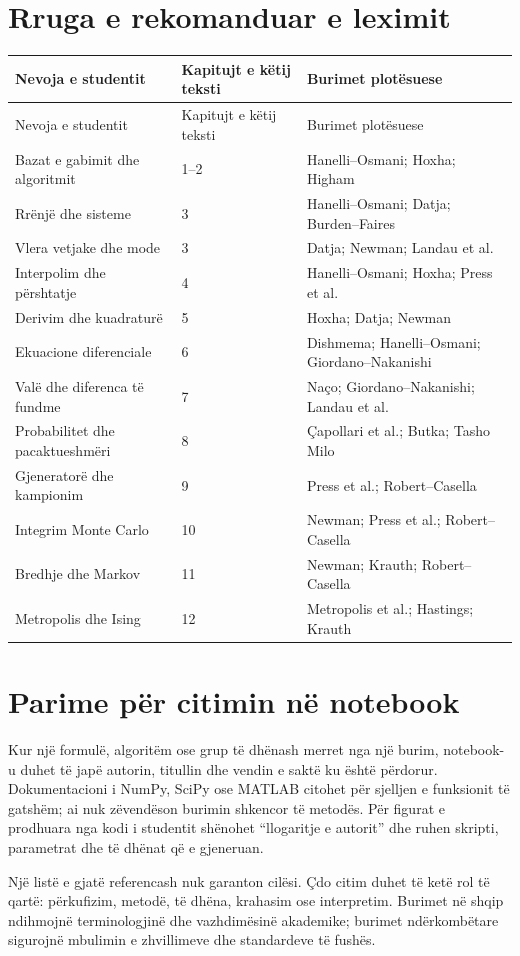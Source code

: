 \section{Rruga e rekomanduar e leximit}
\begin{longtable}{p{}p{}p{}}
\toprule
Nevoja e studentit & Kapitujt e këtij teksti & Burimet plotësuese\\ \midrule
\endfirsthead
\toprule Nevoja e studentit & Kapitujt e këtij teksti & Burimet plotësuese\\ \midrule\endhead
Bazat e gabimit dhe algoritmit & 1--2 & Hanelli--Osmani; Hoxha; Higham\\
Rrënjë dhe sisteme & 3 & Hanelli--Osmani; Datja; Burden--Faires\\
Vlera vetjake dhe mode & 3 & Datja; Newman; Landau et al.\\
Interpolim dhe përshtatje & 4 & Hanelli--Osmani; Hoxha; Press et al.\\
Derivim dhe kuadraturë & 5 & Hoxha; Datja; Newman\\
Ekuacione diferenciale & 6 & Dishmema; Hanelli--Osmani; Giordano--Nakanishi\\
Valë dhe diferenca të fundme & 7 & Naço; Giordano--Nakanishi; Landau et al.\\
Probabilitet dhe pacaktueshmëri & 8 & Çapollari et al.; Butka; Tasho Milo\\
Gjeneratorë dhe kampionim & 9 & Press et al.; Robert--Casella\\
Integrim Monte Carlo & 10 & Newman; Press et al.; Robert--Casella\\
Bredhje dhe Markov & 11 & Newman; Krauth; Robert--Casella\\
Metropolis dhe Ising & 12 & Metropolis et al.; Hastings; Krauth\\
\bottomrule
\end{longtable}

\section{Parime për citimin në notebook}
Kur një formulë, algoritëm ose grup të dhënash merret nga një burim, notebook-u duhet të japë autorin, titullin dhe vendin e saktë ku është përdorur. Dokumentacioni i NumPy, SciPy ose MATLAB citohet për sjelljen e funksionit të gatshëm; ai nuk zëvendëson burimin shkencor të metodës. Për figurat e prodhuara nga kodi i studentit shënohet ``llogaritje e autorit'' dhe ruhen skripti, parametrat dhe të dhënat që e gjeneruan.

Një listë e gjatë referencash nuk garanton cilësi. Çdo citim duhet të ketë rol të qartë: përkufizim, metodë, të dhëna, krahasim ose interpretim. Burimet në shqip ndihmojnë terminologjinë dhe vazhdimësinë akademike; burimet ndërkombëtare sigurojnë mbulimin e zhvillimeve dhe standardeve të fushës.
